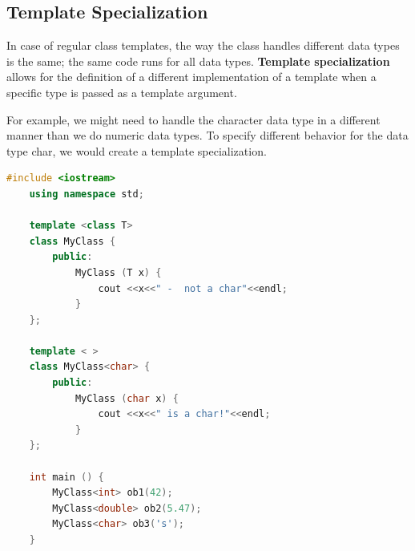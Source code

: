 \documentclass[12pt , a4paper]{article}
\begin{document}
	\subsection{Template Specialization}
	In case of regular class templates, the way the class handles different data types is the same; the same code runs for all data types.
	\textbf{Template specialization} allows for the definition of a different implementation of a template when a specific type is passed as a template argument.
	\begin{problemDefBox}
	For example, we might need to handle the character data type in a different manner than we do numeric data types. To specify different behavior for the data type char, we would create a template specialization.
	\end{problemDefBox} 	
	\begin{lstlisting}[language=C++]
	#include <iostream>
	using namespace std;
	
	template <class T>
	class MyClass {
	    public:
	        MyClass (T x) {
	            cout <<x<<" -  not a char"<<endl;
	        }
	};
	
	template < >
	class MyClass<char> {
	    public:
	        MyClass (char x) {
	            cout <<x<<" is a char!"<<endl;
	        }
	};
	
	int main () {
	    MyClass<int> ob1(42);
	    MyClass<double> ob2(5.47);
	    MyClass<char> ob3('s');
	}
	\end{lstlisting}
\end{document}
